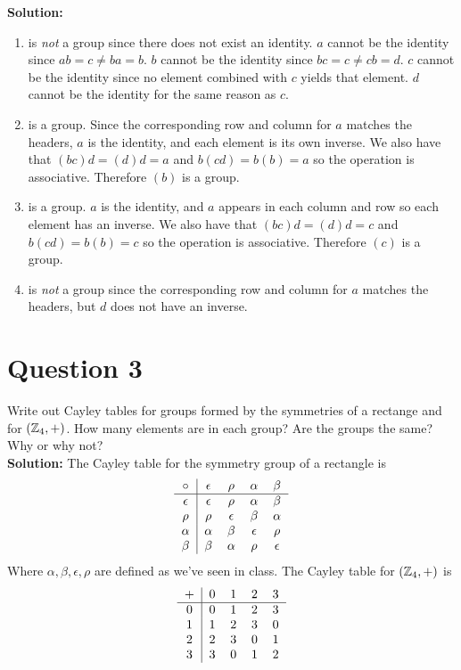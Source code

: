\documentclass[openany]{report}
\begin{document}
\textbf{Solution:}
\begin{enumerate}[label=(\alph*)]
    \item is \emph{not} a group since there does not exist an identity. $a$ cannot be the identity since $ab = c \neq ba = b$. $b$ cannot be the identity since $bc = c \neq cb = d$. $c$ cannot be the identity since no element combined with $c$ yields that element. $d$ cannot be the identity for the same reason as $c$.
    \item is a group. Since the corresponding row and column for $a$ matches the headers, $a$ is the identity, and each element is its own inverse. We also have that $(bc)d = (d)d = a$ and $b(cd) = b(b) = a$ so the operation is associative. Therefore $(b)$ is a group.
    \item is a group. $a$ is the identity, and $a$ appears in each column and row so each element has an inverse. We also have that $(bc)d = (d)d = c$ and $b(cd) = b(b) = c$ so the operation is associative. Therefore $(c)$ is a group.
    \item is \emph{not} a group since the corresponding row and column for $a$ matches the headers, but $d$ does not have an inverse.
\end{enumerate}
\section{Question 3}
Write out Cayley tables for groups formed by the symmetries of a rectange and for $(\mathbb{Z}_4, +)$. How many elements are in each group? Are the groups the same? Why or why not? \\[3ex]
\textbf{Solution:} The Cayley table for the symmetry group of a rectangle is
\[\begin{tabular}{c|cccc}
    $\circ$ & $\epsilon$ & $\rho$ & $\alpha$ & $\beta$\\
    \hline
    $\epsilon$ & $\epsilon$ & $\rho$ & $\alpha$ & $\beta$\\
    $\rho$ & $\rho$ & $\epsilon$ & $\beta$ & $\alpha$\\
    $\alpha$ & $\alpha$ & $\beta$ & $\epsilon$ & $\rho$\\
    $\beta$ & $\beta$ & $\alpha$ & $\rho$ & $\epsilon$\\
\end{tabular}\]
Where $\alpha, \beta, \epsilon, \rho$ are defined as we've seen in class. The Cayley table for $(\mathbb{Z}_4, +)$ is
\[\begin{tabular}{c|cccc}
    + & 0 & 1 & 2 & 3\\
    \hline
    0 & 0 & 1 & 2 & 3\\
    1 & 1 & 2 & 3 & 0\\
    2 & 2 & 3 & 0 & 1\\
    3 & 3 & 0 & 1 & 2\\
\end{tabular}\]
\end{document}
